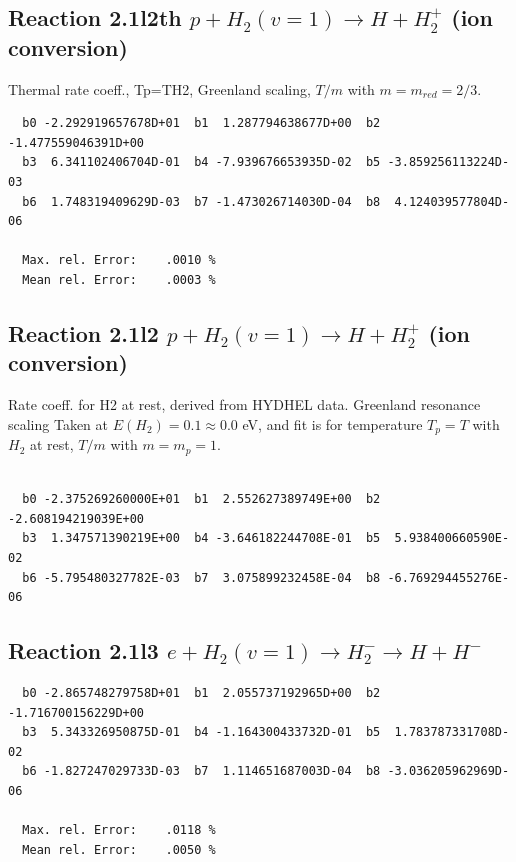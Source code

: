 \documentclass[12pt,dvipdfmx]{article}
\begin{document}
\subsection{
Reaction 2.1l2th
$ p + H_2(v=1) \rightarrow H + H_2^+$ (ion conversion)
}
Thermal rate coeff., Tp=TH2, Greenland scaling,
$T/m$ with $m=m_{red}=2/3$.

\begin{small}\begin{verbatim}
  b0 -2.292919657678D+01  b1  1.287794638677D+00  b2 -1.477559046391D+00
  b3  6.341102406704D-01  b4 -7.939676653935D-02  b5 -3.859256113224D-03
  b6  1.748319409629D-03  b7 -1.473026714030D-04  b8  4.124039577804D-06

  Max. rel. Error:    .0010 %
  Mean rel. Error:    .0003 %
\end{verbatim}\end{small}

\subsection{
Reaction 2.1l2
$ p + H_2(v=1) \rightarrow H + H_2^+$ (ion conversion)
}
Rate coeff. for H2 at rest, derived from HYDHEL data. Greenland resonance scaling
Taken at $E(H_2) = 0.1 \approx 0.0$ eV,  and fit is for temperature $T_p=T$ with $H_2$ at rest,
$T/m$ with $m=m_p=1$.

\begin{small}\begin{verbatim}

  b0 -2.375269260000E+01  b1  2.552627389749E+00  b2 -2.608194219039E+00
  b3  1.347571390219E+00  b4 -3.646182244708E-01  b5  5.938400660590E-02
  b6 -5.795480327782E-03  b7  3.075899232458E-04  b8 -6.769294455276E-06

\end{verbatim}\end{small}

\subsection{
Reaction 2.1l3
 $ e + H_2(v=1) \rightarrow H_2^- \rightarrow H + H^-$
}


\begin{small}\begin{verbatim}
  b0 -2.865748279758D+01  b1  2.055737192965D+00  b2 -1.716700156229D+00
  b3  5.343326950875D-01  b4 -1.164300433732D-01  b5  1.783787331708D-02
  b6 -1.827247029733D-03  b7  1.114651687003D-04  b8 -3.036205962969D-06

  Max. rel. Error:    .0118 %
  Mean rel. Error:    .0050 %
\end{verbatim}\end{small}
\end{document}
